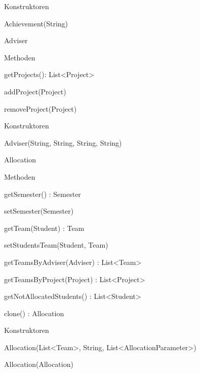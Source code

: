 \documentclass[parskip=full]{scrartcl}
\begin{document}
\begin{itemPackage}
\begin{itemClass}
\begin{itemClassSub}
\item Konstruktoren
\begin{itemPlus}
\item Achievement(String)
\end{itemPlus}
\end{itemClassSub}
\item Adviser
\item \begin{itemClassSub}
\item Methoden
\begin{itemPlus}
\item getProjects(): List<Project>
\end{itemPlus}
\begin{itemMinus}
\item addProject(Project)
\item removeProject(Project)
\end{itemMinus}
\item Konstruktoren
\begin{itemPlus}
\item Adviser(String, String, String, String)
\end{itemPlus}
\end{itemClassSub}
\item Allocation
\item \begin{itemClassSub}
\item Methoden
\begin{itemPlus}
\item getSemester() : Semester
\item setSemester(Semester)
\item getTeam(Student) : Team
\item setStudentsTeam(Student, Team)
\item getTeamsByAdviser(Adviser) : List<Team>
\item getTeamsByProject(Project) : List<Project>
\item getNotAllocatedStudents() : List<Student>
\end{itemPlus}
\begin{itemMinus}
\item clone() : Allocation
\end{itemMinus}
\item Konstruktoren
\begin{itemPlus}
\item Allocation(List<Team>, String, List<AllocationParameter>)
\item Allocation(Allocation)

\end{itemPlus}
\end{itemClassSub}
\end{itemClass}
\end{itemPackage}
\end{document}
